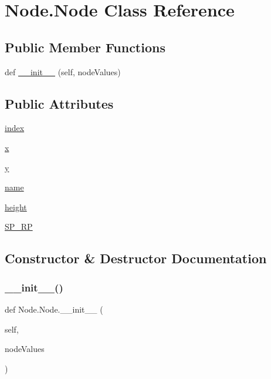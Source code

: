 \hypertarget{class_node_1_1_node}{}\section{Node.\+Node Class Reference}
\label{class_node_1_1_node}
\subsection*{Public Member Functions}
\begin{DoxyCompactItemize}
\item 
def \hyperlink{class_node_1_1_node_a07eea18e16b4ea130ed202d99512091b}{\+\_\+\+\_\+init\+\_\+\+\_\+} (self, node\+Values)
\end{DoxyCompactItemize}
\subsection*{Public Attributes}
\begin{DoxyCompactItemize}
\item 
\hyperlink{class_node_1_1_node_aef9465565b12f9f28b6aefe822948af5}{index}
\item 
\hyperlink{class_node_1_1_node_a6bfcdef2c07be856e8850fcbdbb82025}{x}
\item 
\hyperlink{class_node_1_1_node_aab9b32354c529afe23970aeda52308b9}{y}
\item 
\hyperlink{class_node_1_1_node_a66728b66d1a530a57277759e3993550c}{name}
\item 
\hyperlink{class_node_1_1_node_aca249f2f0b0bcb239c4e201048412b72}{height}
\item 
\hyperlink{class_node_1_1_node_a036a86db86d1899d2dff6915f6092328}{S\+P\+\_\+\+RP}
\end{DoxyCompactItemize}


\subsection{Constructor \& Destructor Documentation}
\mbox{\label{class_node_1_1_node_a07eea18e16b4ea130ed202d99512091b}} 
\subsubsection{\texorpdfstring{\+\_\+\+\_\+init\+\_\+\+\_\+()}{\_\_init\_\_()}}
{\footnotesize\ttfamily def Node.\+Node.\+\_\+\+\_\+init\+\_\+\+\_\+ (\begin{DoxyParamCaption}\item[{}]{self,  }\item[{}]{node\+Values }\end{DoxyParamCaption})}



